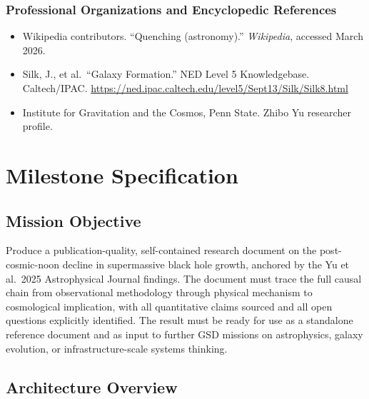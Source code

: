 \documentclass[11pt,letterpaper]{article}
\newcommand{\stageheader}[2]{%
  \noindent\colorbox{#2}{\makebox[\textwidth][l]{%
    \textcolor{white}{\bfseries\sffamily\hspace{6pt}#1\hspace{6pt}}}}%
  \vspace{0.5em}\par%
}
\begin{document}
\subsubsection{Professional Organizations and Encyclopedic References}

\begin{itemize}
  \item Wikipedia contributors. ``Quenching (astronomy).'' \textit{Wikipedia}, accessed March 2026.
  \item Silk, J., et al.\ ``Galaxy Formation.'' NED Level 5 Knowledgebase. Caltech/IPAC. \url{https://ned.ipac.caltech.edu/level5/Sept13/Silk/Silk8.html}
  \item Institute for Gravitation and the Cosmos, Penn State. Zhibo Yu researcher profile.
\end{itemize}

\newpage
\stageheader{STAGE 3 --- MISSION PACKAGE}{tertiary}

\section{Milestone Specification}

\subsection{Mission Objective}

Produce a publication-quality, self-contained research document on the post-cosmic-noon decline in supermassive black hole growth, anchored by the Yu et al.\ 2025 Astrophysical Journal findings. The document must trace the full causal chain from observational methodology through physical mechanism to cosmological implication, with all quantitative claims sourced and all open questions explicitly identified. The result must be ready for use as a standalone reference document and as input to further GSD missions on astrophysics, galaxy evolution, or infrastructure-scale systems thinking.

\subsection{Architecture Overview}
\end{document}
